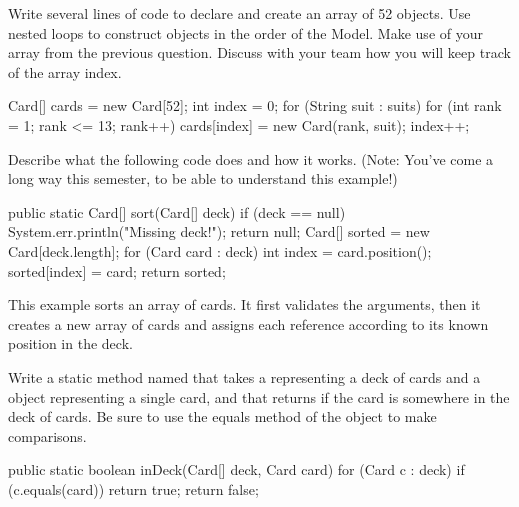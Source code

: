 \Q Write several lines of code to declare and create an array of 52  objects.
Use nested  loops to construct  objects in the order of the Model.
Make use of your  array from the previous question.
Discuss with your team how you will keep track of the array index.

\vspace*{-1ex}
\begin{answer}[11em]
\begin{javaans}
Card[] cards = new Card[52];
int index = 0;
for (String suit : suits) {
    for (int rank = 1; rank <= 13; rank++) {
        cards[index] = new Card(rank, suit);
        index++;
    }
}
\end{javaans}
\end{answer}


\Q Describe what the following code does and how it works. (Note: You've come a long way this semester, to be able to understand this example!)

\begin{javalst}
public static Card[] sort(Card[] deck) {
    if (deck == null) {
        System.err.println("Missing deck!");
        return null;
    }
    Card[] sorted = new Card[deck.length];
    for (Card card : deck) {
        int index = card.position();
        sorted[index] = card;
    }
    return sorted;
}
\end{javalst}

\begin{answer}[5em]
This example sorts an array of cards.
It first validates the arguments, then it creates a new array of cards and assigns each  reference according to its known position in the deck.
\end{answer}


\Q Write a static method named  that takes a  representing a deck of cards and a  object representing a single card, and that returns  if the card is somewhere in the deck of cards. Be sure to use the equals method of the  object to make comparisons.

\vspace{-1ex}
\begin{answer}[11em]
\begin{javaans}
public static boolean inDeck(Card[] deck, Card card) {
    for (Card c : deck) {
        if (c.equals(card)) {
            return true;
        }
    }
    return false;
}
\end{javaans}
\end{answer}
